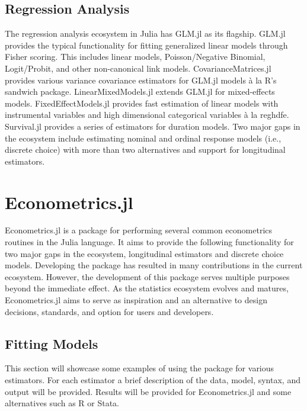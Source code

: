 \documentclass{juliacon}
\begin{document}
\subsection{Regression Analysis}

The regression analysis ecosystem in Julia has GLM.jl \cite{GLM.jl} as its flagship. GLM.jl provides the typical functionality for fitting generalized linear models through Fisher scoring. This includes linear models, Poisson/Negative Binomial, Logit/Probit, and other non-canonical link models. CovarianceMatrices.jl \cite{CovarianceMatrices.jl} provides various variance covariance estimators for GLM.jl models à la R's
sandwich package. LinearMixedModels.jl \cite{LinearMixedModels} extends GLM.jl for mixed-effects models. FixedEffectModels.jl provides fast estimation of linear models with instrumental variables and high dimensional categorical variables à la reghdfe. Survival.jl \cite{Survival.jl} provides a series of estimators for duration models. Two major gaps in the ecosystem include estimating nominal and ordinal response models (i.e., discrete choice) with more than two alternatives and support for longitudinal estimators.

\section{Econometrics.jl}

Econometrics.jl is a package for performing several common econometrics routines in the Julia language. It aims to provide the following functionality for two major gaps in the ecosystem, longitudinal estimators and discrete choice models. Developing the package has resulted in many contributions in the current ecosystem. However, the development of this package serves multiple purposes beyond the immediate effect. As the statistics ecosystem evolves and matures, Econometrics.jl aims to serve as inspiration and an alternative to design decisions, standards, and option for users and developers.

\subsection{Fitting Models}

This section will showcase some examples of using the package for various estimators. For each estimator a brief description of the data, model, syntax, and output will be provided. Results will be provided for Econometrics.jl and some alternatives such as R or Stata.
\end{document}
